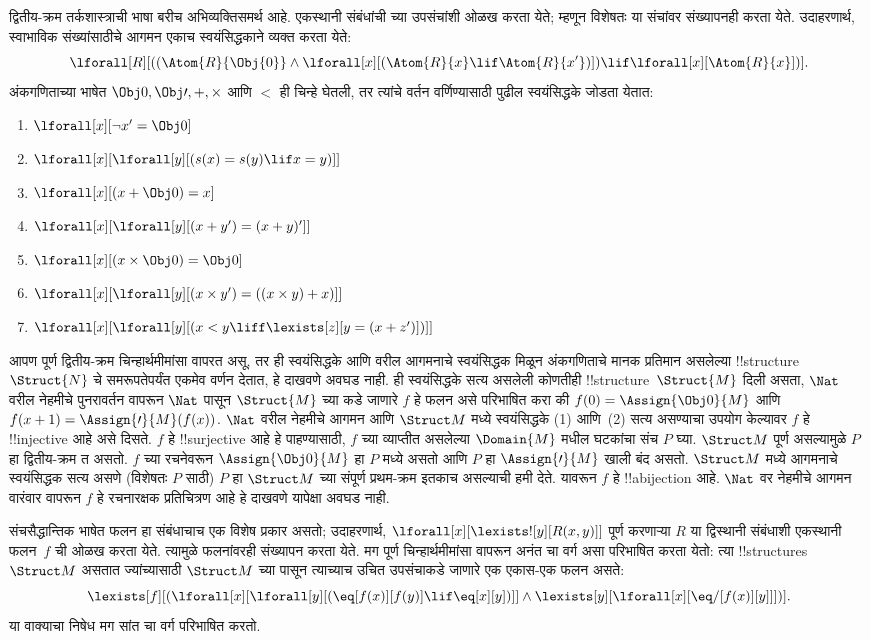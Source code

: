 \documentclass[../../../include/open-logic-section]{subfiles}
\begin{document}
द्वितीय-क्रम तर्कशास्त्राची भाषा बरीच अभिव्यक्तिसमर्थ आहे. एकस्थानी संबंधांची
च्या उपसंचांशी ओळख करता येते; म्हणून विशेषतः या संचांवर संख्यापनही
करता येते. उदाहरणार्थ, स्वाभाविक संख्यांसाठीचे आगमन एकाच स्वयंसिद्धकाने
व्यक्त करता येते:
\[
\lforall[R][((\Atom{R}{\Obj{0}} \land \lforall[x][(\Atom{R}{x} \lif
    \Atom{R}{x'})]) \lif \lforall[x][\Atom{R}{x}])].
\]
अंकगणिताच्या भाषेत $\Obj 0, \Obj \prime, +, \times$ आणि $<$ ही चिन्हे घेतली,
तर त्यांचे वर्तन वर्णिण्यासाठी पुढील स्वयंसिद्धके जोडता येतात:
\begin{enumerate}
\item $\lforall[x][\lnot x' = \Obj 0]$
\item $\lforall[x][\lforall[y][(s(x) = s(y) \lif x = y)]]$
\item $\lforall[x][(x + \Obj 0) = x]$
\item $\lforall[x][\lforall[y][(x + y') = (x + y)']]$
\item $\lforall[x][(x \times \Obj 0) = \Obj 0]$
\item $\lforall[x][\lforall[y][(x \times y') = ((x \times y) + x)]]$
\item $\lforall[x][\lforall[y][(x < y \liff \lexists[z][y = (x + z')])]]$
\end{enumerate}
आपण पूर्ण द्वितीय-क्रम चिन्हार्थमीमांसा वापरत असू, तर ही स्वयंसिद्धके आणि
वरील आगमनाचे स्वयंसिद्धक मिळून अंकगणिताचे मानक प्रतिमान असलेल्या
!!{structure}~$\Struct{N}$ चे समरूपतेपर्यंत एकमेव वर्णन देतात, हे दाखवणे
अवघड नाही. ही स्वयंसिद्धके सत्य असलेली कोणतीही !!{structure}~$\Struct{M}$
दिली असता, $\Nat$ वरील नेहमीचे पुनरावर्तन वापरून $\Nat$ पासून
$\Struct{M}$ च्या कडे जाणारे $f$ हे फलन असे परिभाषित करा की
$f(0) = \Assign{\Obj 0}{M}$ आणि $f(x+1) = \Assign{\prime}{M}(f(x))$.
$\Nat$ वरील नेहमीचे आगमन आणि $\Struct M$ मध्ये स्वयंसिद्धके (1) आणि~(2)
सत्य असण्याचा उपयोग केल्यावर $f$ हे !!{injective} आहे असे दिसते. $f$ हे
!!{surjective} आहे हे पाहण्यासाठी, $f$ च्या व्याप्तीत असलेल्या
$\Domain{M}$ मधील घटकांचा संच $P$ घ्या. $\Struct M$ पूर्ण असल्यामुळे $P$
हा द्वितीय-क्रम त असतो. $f$ च्या रचनेवरून
$\Assign{\Obj 0}{M}$ हा $P$ मध्ये असतो आणि $P$ हा
$\Assign{\prime}{M}$ खाली बंद असतो. $\Struct M$ मध्ये आगमनाचे स्वयंसिद्धक
सत्य असणे (विशेषतः $P$ साठी) $P$ हा $\Struct M$ च्या संपूर्ण प्रथम-क्रम
इतकाच असल्याची हमी देते. यावरून $f$ हे !!a{bijection} आहे.
$\Nat$ वर नेहमीचे आगमन वारंवार वापरून $f$ हे रचनारक्षक प्रतिचित्रण आहे हे
दाखवणे यापेक्षा अवघड नाही.

संचसैद्धान्तिक भाषेत फलन हा संबंधाचाच एक विशेष प्रकार असतो; उदाहरणार्थ,
$\lforall[x][\lexists![y][R(x,y)]]$ पूर्ण करणाऱ्या $R$ या द्विस्थानी
संबंधाशी एकस्थानी फलन~$f$ ची ओळख करता येते. त्यामुळे फलनांवरही संख्यापन करता
येते. मग पूर्ण चिन्हार्थमीमांसा वापरून अनंत चा वर्ग असा
परिभाषित करता येतो: त्या !!{structure}s $\Struct M$ असतात ज्यांच्यासाठी
$\Struct M$ च्या पासून त्याच्याच उचित उपसंचाकडे जाणारे एक
एकास-एक फलन असते:
\[
\lexists[f][(\lforall[x][\lforall[y][(\eq[f(x)][f(y)] \lif \eq[x][y])]]
  \land \lexists[y][\lforall[x][\eq/[f(x)][y]]])].
\]
या वाक्याचा निषेध मग सांत चा वर्ग परिभाषित करतो.
\end{document}
